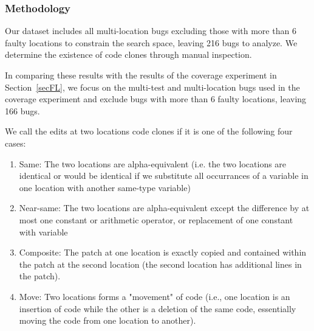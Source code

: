 \documentclass[10pt, conference]{IEEEtran}
\begin{document}

\subsubsection{Methodology}
\label{sec52}%
Our dataset includes all multi-location bugs excluding those with more than 6 faulty locations to 
constrain the search space, leaving 216 bugs to analyze. We determine the existence of code 
clones through manual inspection.


In comparing these results with the results of the coverage experiment in
Section~\ref{secFL}, we focus on the multi-test and multi-location bugs used in the coverage 
experiment and exclude bugs with more than 6 faulty locations, leaving 166 bugs.

We call the edits at two locations code clones if it is one of the following four cases:
\begin{enumerate}
\item Same: The two locations are alpha-equivalent (i.e. the two locations are identical or would be
identical if we substitute all occurrances of a variable in one location with another same-type variable)
\item Near-same: The two locations are alpha-equivalent except the difference by at most one constant or arithmetic operator,
or replacement of one constant with variable
\item Composite: The patch at one location is exactly copied and contained within the patch at 
the 
second location (the second location  has additional lines in the patch).
\item Move: Two locations forms a "movement" of code (i.e., one location is an insertion of 
code 
while the other is a deletion of the same code, essentially moving the code from one location to 
another).
\end{enumerate}
\end{document}
